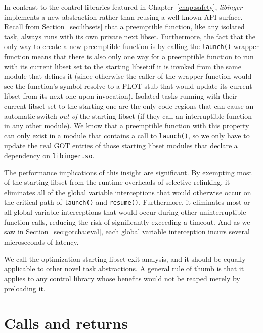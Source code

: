 In contrast to the control libraries featured in Chapter~\ref{chap:safety},
\textit{libinger} implements a new abstraction rather than reusing a well-known API
surface.  Recall from Section~\ref{sec:libsets} that a
preemptible function, like any isolated task, always runs with its own private next
libset.  Furthermore, the fact that the only way to create a new preemptible function
is by calling the \texttt{launch()} wrapper function means that there is also only
one way for a preemptible function to run with its current libset set to the starting
libset:\@ if it is invoked from the same module that defines it (since otherwise the
caller of the wrapper function would see the function's symbol resolve to a PLOT stub
that would update its current libset from its next one upon invocation).  Isolated
tasks running with their current libset set to the starting one are the only code
regions that can cause an automatic switch \textit{out of} the starting libset (if
they call an interruptible function in any other module).  We know that a preemptible
function with this property can only exist in a module that contains a call to
\texttt{launch()}, so we only have to update the real GOT entries of those starting
libset modules that declare a dependency on \texttt{libinger.so}.

The performance
implications of this insight are significant.  By exempting most of the starting
libset from the runtime overheads of selective relinking, it eliminates all of the
global variable interceptions that would otherwise occur on the critical path of
\texttt{launch()} and \texttt{resume()}.  Furthermore, it eliminates most or all
global variable interceptions that would occur during other uninterruptible function
calls, reducing the risk of significantly exceeding a timeout.  And as we saw in
Section~\ref{sec:gotcha:eval}, each global variable interception incurs several
microseconds of latency.

We call the optimization starting libset exit analysis,
and it should be equally applicable to other
novel task abstractions.  A general rule of thumb is that it applies to any control
library whose benefits would not be reaped merely by preloading it.


\section{Calls and returns}
\label{sec:libinger:jumps}

